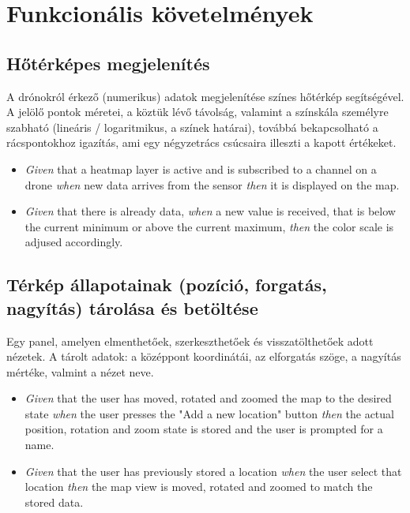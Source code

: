 \section{Funkcionális követelmények}

\subsection{Hőtérképes megjelenítés}

A drónokról érkező (numerikus) adatok megjelenítése színes hőtérkép segítségével.
A jelölő pontok méretei, a köztük lévő távolság, valamint a színskála személyre szabható (lineáris / logaritmikus, a színek határai), továbbá bekapcsolható a rácspontokhoz igazítás, ami egy négyzetrács csúcsaira illeszti a kapott értékeket.

\begin {itemize}
  \item \textit{Given} that a heatmap layer is active and is subscribed to a channel on a drone \textit{when} new data arrives from the sensor \textit{then} it is displayed on the map.
  \item \textit{Given} that there is already data, \textit{when} a new value is received, that is below the current minimum or above the current maximum, \textit{then} the color scale is adjused accordingly.
\end {itemize}


\subsection{Térkép állapotainak (pozíció, forgatás, nagyítás) tárolása és betöltése}

Egy panel, amelyen elmenthetőek, szerkeszthetőek és visszatölthetőek adott nézetek. A tárolt adatok: a középpont koordinátái, az elforgatás szöge, a nagyítás mértéke, valmint a nézet neve.

\begin {itemize}
  \item \textit{Given} that the user has moved, rotated and zoomed the map to the desired state \textit{when} the user presses the "Add a new location" button \textit{then} the actual position, rotation and zoom state is stored and the user is prompted for a name.
  \item \textit{Given} that the user has previously stored a location \textit{when} the user select that location \textit{then} the map view is moved, rotated and zoomed to match the stored data.
\end {itemize}


